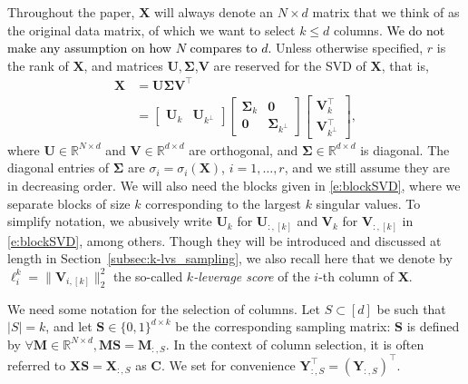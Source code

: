 \documentclass[twoside,11pt]{book}
\newcommand{\rev}[1]{\textcolor{black}{#1}}
\numberwithin{theorem}{chapter}
\numberwithin{definition}{chapter}
\numberwithin{proposition}{chapter}
\numberwithin{corollary}{chapter}
\numberwithin{example}{chapter}
\numberwithin{lemma}{chapter}
\numberwithin{assumption}{chapter}
\numberwithin{equation}{chapter}
\numberwithin{figure}{chapter}
\DeclareMathOperator{\Tran}{\intercal}
\begin{document}
Throughout the paper, $\bm{X}$ will always denote an $N\times d$ matrix that we think of as the original data matrix, of which we want to select $k\leq d$ columns. \rev{We do not make any assumption on how $N$ compares to $d$.} Unless otherwise specified, $r$ is the rank of $\bm{X}$, and matrices $\bm{U},\bm{\Sigma}$,$\bm{V}$ are reserved for the SVD of $\bm{X}$, that is,
\begin{align}
   \bm{X} &= \bm{U}\bm{\Sigma}\bm{V}^{\Tran}\\
   &=
\left[
\begin{array}{c|c}
\bm{U}_{k} & \bm{U}_{k^{\perp}}
\end{array}
\right]
\left[
\begin{array}{c|c}
\bm{\Sigma}_{k} & \bm{0} \\
\hline
\bm{0} & \bm{\Sigma}_{k^{\perp}}
\end{array}
\right]
\left[
\begin{array}{c}
\bm{V}_{k}^{\Tran} \\
\hline
\bm{V}_{k^{\perp}}^{\Tran}
\end{array}
\right],
\label{e:blockSVD}
\end{align}
where $\bm{U} \in \mathbb{R}^{N\times d}$ and $\bm{V} \in \mathbb{R}^{d \times d}$ are orthogonal, and $\bm{\Sigma} \in \mathbb{R}^{d \times d}$ is diagonal. The diagonal entries of $\bm{\Sigma}$ are $\sigma_i=\sigma_i(\bm{X})$, $i=1,\dots,r$, and we still assume they are in decreasing order. We will also need the blocks given in \eqref{e:blockSVD}, where we separate blocks of size $k$ corresponding to the largest $k$ singular values. To simplify notation, we abusively write $\bm{U}_{k}$ for $\bm{U}_{:,[k]}$ and $\bm{V}_{k}$ for $\bm{V}_{:,[k]}$ in \eqref{e:blockSVD}, among others. Though they will be introduced and discussed at length in Section~\ref{subsec:k-lvs_sampling}, we also recall here that we denote by $\ell_{i}^{k} = \|\bm{V}_{i,[k]}\|_{2}^{2}$ the so-called \emph{ $k$-leverage score} of the $i$-th column of $\bm{X}$.

We need some notation for the selection of columns. Let $S \subset [d]$ be such that $\vert S\vert =k$, and let $\bm{S} \in \{0,1\}^{d \times k}$ be the corresponding sampling matrix: $\bm{S}$ is defined by $\forall \bm{M} \in \mathbb{R}^{N\times d}, \bm{M}\bm{S} = \bm{M}_{:,S}$. In the context of column selection, it is often referred to $\bm{X}\bm{S} = \bm{X}_{:,S}$ as $\bm{C}$. We set for convenience $\bm{Y}_{:,S}^{\Tran} = (\bm{Y}_{:,S})^{\Tran}$.
\end{document}
